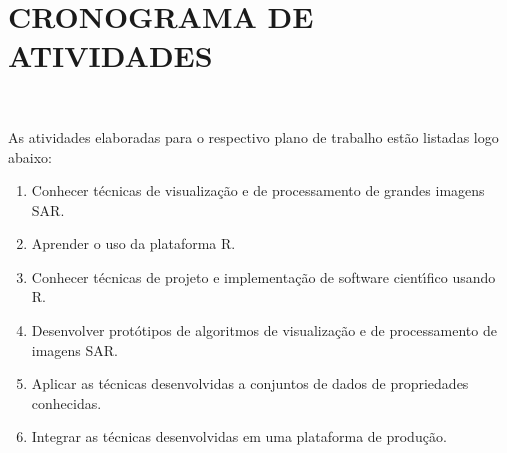 \documentclass[12pt,letterpaper]{article}
\begin{document}

\newpage
\section*{\centering \textbf{CRONOGRAMA DE ATIVIDADES}}
\hrulefill \\

\vspace{0.5cm}

As atividades elaboradas para o respectivo plano de trabalho estão listadas logo abaixo:

\begin{small}
\begin{enumerate} 
  \item  Conhecer técnicas de visualização e de processamento de grandes imagens SAR.
  \item  Aprender o uso da plataforma R.
  \item  Conhecer técnicas de projeto e implementação de software cientı́fico usando R.
  \item Desenvolver protótipos de algoritmos de visualização e de processamento de imagens SAR.
  \item Aplicar as técnicas desenvolvidas a conjuntos de dados de propriedades conhecidas.
  \item  Integrar as técnicas desenvolvidas em uma plataforma de produção.
\end{enumerate}
\end{small}
\end{document}
